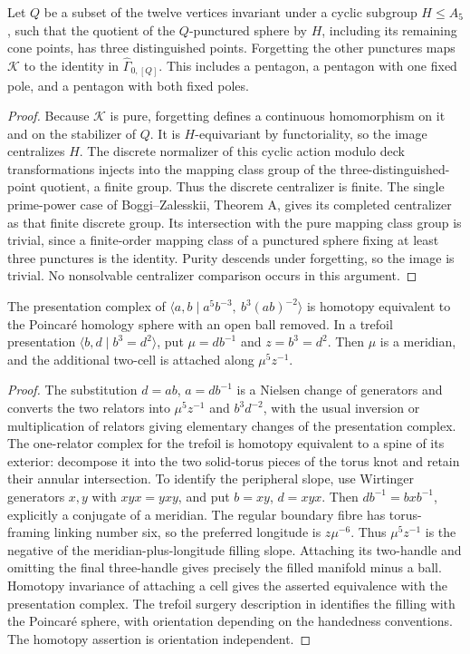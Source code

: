 Let \(Q\) be a subset of the twelve vertices invariant under a
cyclic subgroup \(H\leq A_5\), such that the quotient of the
\(Q\)-punctured sphere by \(H\), including its remaining cone
points, has three distinguished points. Forgetting the other
punctures maps \(\mathcal K\) to the identity in
\(\widehat\Gamma_{0,[Q]}\). This includes a pentagon, a pentagon
with one fixed pole, and a pentagon with both fixed poles.
\begin{proof}
Because \(\mathcal K\) is pure, forgetting defines a continuous
homomorphism on it and on the stabilizer of \(Q\). It is
\(H\)-equivariant by functoriality, so the image centralizes \(H\).
The discrete normalizer of this cyclic action modulo deck
transformations injects into the mapping class group of the
three-distinguished-point quotient, a finite group. Thus the
discrete centralizer is finite. The single prime-power case of
Boggi--Zalesskii, Theorem A, gives its completed centralizer as
that finite discrete group. Its intersection with the pure
mapping class group is trivial, since a finite-order mapping
class of a punctured sphere fixing at least three punctures is
the identity. Purity descends under forgetting, so the image is
trivial. No nonsolvable centralizer comparison occurs in this
argument.
\end{proof}

The presentation complex of
\(\langle a,b\mid a^5b^{-3},\ b^3(ab)^{-2}\rangle\)
is homotopy equivalent to the Poincar\'e homology sphere with
an open ball removed. In a trefoil presentation
\(\langle b,d\mid b^3=d^2\rangle\), put
\(\mu=db^{-1}\) and \(z=b^3=d^2\).
Then \(\mu\) is a meridian, and the additional two-cell is
attached along \(\mu^5z^{-1}\).
\begin{proof}
The substitution \(d=ab\), \(a=db^{-1}\) is a Nielsen
change of generators and converts the two relators into
\(\mu^5z^{-1}\) and \(b^3d^{-2}\), with the usual inversion
or multiplication of relators giving elementary changes of the
presentation complex. The one-relator complex for the trefoil is
homotopy equivalent to a spine of its exterior: decompose it into the two
solid-torus pieces of the torus knot and retain their annular
intersection. To identify the peripheral slope, use Wirtinger
generators \(x,y\) with \(xyx=yxy\), and put
\(b=xy\), \(d=xyx\). Then \(db^{-1}=bxb^{-1}\), explicitly
a conjugate of a meridian. The regular boundary fibre has
torus-framing linking number six, so the preferred longitude is
\(z\mu^{-6}\). Thus \(\mu^5z^{-1}\) is the negative
of the meridian-plus-longitude filling slope.
Attaching its two-handle and omitting the final three-handle
gives precisely the filled manifold minus a ball. Homotopy
invariance of attaching a cell gives the asserted equivalence
with the presentation complex. The trefoil surgery description in
\citet[Descriptions 6--8]{KirbyScharlemann1979} identifies the
filling with the Poincar\'e sphere, with orientation depending
on the handedness conventions. The homotopy assertion is
orientation independent.
\end{proof}

